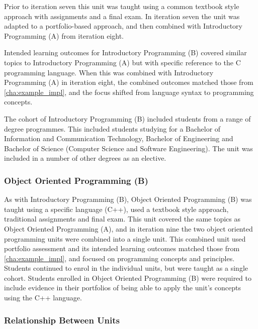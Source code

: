 Prior to iteration seven this unit was taught using a common textbook style approach with assignments and a final exam. In iteration seven the unit was adapted to a portfolio-based approach, and then combined with Introductory Programming (A) from iteration eight.

Intended learning outcomes for Introductory Programming (B) covered similar topics to Introductory Programming (A) but with specific reference to the C programming language. When this was combined with Introductory Programming (A) in iteration eight, the combined outcomes matched those from \cref{cha:example_impl}, and the focus shifted from language syntax to programming concepts.

The cohort of Introductory Programming (B) included students from a range of degree programmes. This included students studying for a Bachelor of Information and Communication Technology, Bachelor of Engineering and Bachelor of Science (Computer Science and Software Engineering). The unit was included in a number of other degrees as an elective.


\subsubsection{Object Oriented Programming (B)} %
\label{ssub:object_oriented_programming_b_}

As with Introductory Programming (B), Object Oriented Programming (B) was taught using a specific language (C++), used a textbook style approach, traditional assignments and final exam. This unit covered the same topics as Object Oriented Programming (A), and in iteration nine the two object oriented programming units were combined into a single unit. This combined unit used portfolio assessment and its intended learning outcomes matched those from \cref{cha:example_impl}, and focused on programming concepts and principles. Students continued to enrol in the individual units, but were taught as a single cohort. Students enrolled in Object Oriented Programming (B) were required to include evidence in their portfolios of being able to apply the unit's concepts using the C++ language.


\subsubsection{Relationship Between Units} %
\label{ssub:relationship_between_units}

